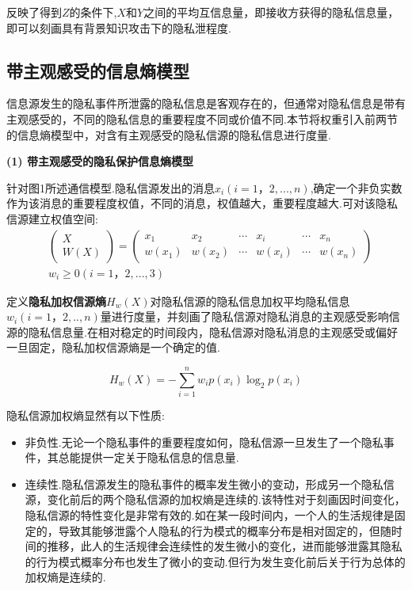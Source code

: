 反映了得到$Z$的条件下,$X$和$Y$之间的平均互信息量，即接收方获得的隐私信息量，即可以刻画具有背景知识攻击下的隐私泄程度.

\subsection{带主观感受的信息熵模型}

信息源发生的隐私事件所泄露的隐私信息是客观存在的，但通常对隐私信息是带有主观感受的，不同的隐私信息的重要程度不同或价值不同.本节将权重引入前两节的信息熵模型中，对含有主观感受的隐私信源的隐私信息进行度量.

\textbf{(1) 带主观感受的隐私保护信息熵模型}

针对图1所述通信模型.隐私信源发出的消息$x_{i}(i=1，2,...,n)$,确定一个非负实数作为该消息的重要程度权值，不同的消息，权值越大，重要程度越大.可对该隐私信源建立权值空间:
\begin{equation}
\begin{split}
&\begin{pmatrix}
X\\ 
W(X)
\end{pmatrix}=\begin{pmatrix}
x_{1} & x_{2} & \cdots  & x_{i} & \cdots  & x_{n}\\ 
w(x_{1})& w(x_{2}) & \cdots & w(x_{i}) & \cdots & w(x_{n})
\end{pmatrix} \\
&w_{i}\geqslant 0(i=1，2,...,3)
\end{split}
\end{equation}

定义\textbf{隐私加权信源熵}$H_{w}(X)$对隐私信源的隐私信息加权平均隐私信息$w_{i}(i=1，2,..,n)$量进行度量，并刻画了隐私信源对隐私消息的主观感受影响信源的隐私信息量.在相对稳定的时间段内，隐私信源对隐私消息的主观感受或偏好一旦固定，隐私加权信源熵是一个确定的值.

\begin{equation}
H_{w}(X)=-\sum_{i=1}^{n}w_{i}p(x_{i})\log_{2}p(x_{i})
\end{equation}

隐私信源加权熵显然有以下性质:
\begin{itemize}
	\item 非负性.无论一个隐私事件的重要程度如何，隐私信源一旦发生了一个隐私事件，其总能提供一定关于隐私信息的信息量.
	\item 连续性.隐私信源发生的隐私事件的概率发生微小的变动，形成另一个隐私信源，变化前后的两个隐私信源的加权熵是连续的.该特性对于刻画因时间变化，隐私信源的特性变化是非常有效的.如在某一段时间内，一个人的生活规律是固定的，导致其能够泄露个人隐私的行为模式的概率分布是相对固定的，但随时间的推移，此人的生活规律会连续性的发生微小的变化，进而能够泄露其隐私的行为模式概率分布也发生了微小的变动.但行为发生变化前后关于行为总体的加权熵是连续的.
\end{itemize}

